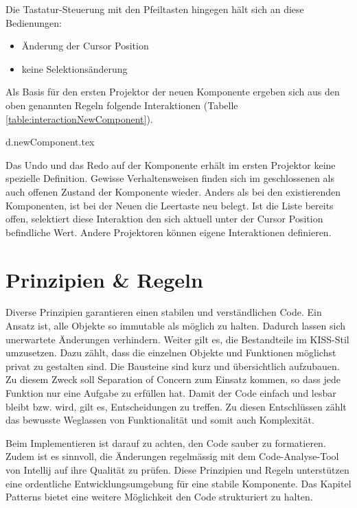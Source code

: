 \noindent
Die Tastatur-Steuerung mit den Pfeiltasten hingegen hält sich an diese Bedienungen:

\begin{itemize}
    \item Änderung der Cursor Position
    \item keine Selektionsänderung
\end{itemize}

\noindent
Als Basis für den ersten Projektor der neuen Komponente ergeben sich aus den oben genannten Regeln folgende Interaktionen (Tabelle \ref{table:interactionNewComponent}). 

\clearpage
{d.newComponent.tex}

Das Undo und das Redo auf der Komponente erhält im ersten Projektor keine spezielle Definition. 
Gewisse Verhaltensweisen finden sich im geschlossenen als auch offenen Zustand der Komponente wieder. 
Anders als bei den existierenden Komponenten, ist bei der Neuen die Leertaste neu belegt. 
Ist die Liste bereits offen, selektiert diese Interaktion den sich aktuell unter der Cursor Position befindliche Wert. 
Andere Projektoren können eigene Interaktionen definieren. 


\section{Prinzipien \& Regeln}
\label{sec:principleRules}

Diverse Prinzipien garantieren einen stabilen und verständlichen Code. 
Ein Ansatz ist, alle Objekte so immutable als möglich zu halten. 
Dadurch lassen sich unerwartete Änderungen verhindern. 
Weiter gilt es, die Bestandteile im KISS-Stil umzusetzen. 
Dazu zählt, dass die einzelnen Objekte und Funktionen möglichst privat zu gestalten sind. 
Die Bausteine sind kurz und übersichtlich aufzubauen. 
Zu diesem Zweck soll Separation of Concern zum Einsatz kommen, so dass jede Funktion nur eine Aufgabe zu erfüllen hat. 
Damit der Code einfach und lesbar bleibt bzw. wird, gilt es, Entscheidungen zu treffen. 
Zu diesen Entschlüssen zählt das bewusste Weglassen von Funktionalität und somit auch Komplexität. 

Beim Implementieren ist darauf zu achten, den Code sauber zu formatieren. 
Zudem ist es sinnvoll, die Änderungen regelmässig mit dem Code-Analyse-Tool von Intellij auf ihre Qualität zu prüfen. 
Diese Prinzipien und Regeln unterstützen eine ordentliche Entwicklungsumgebung für eine stabile Komponente. 
Das Kapitel Patterns bietet eine weitere Möglichkeit den Code strukturiert zu halten. 


